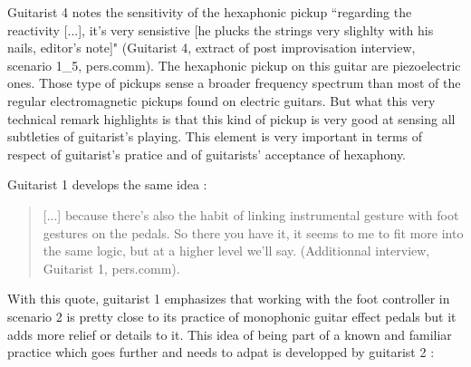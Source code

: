 \documentclass{article}
\begin{document}
Guitarist 4 notes the sensitivity of the hexaphonic pickup ``regarding the reactivity [...], it's very sensistive [he plucks the strings very slighlty with his nails, editor's note]" (Guitarist 4, extract of post improvisation interview,  scenario 1\_5, pers.comm). The hexaphonic pickup on this guitar are piezoelectric ones. Those type of pickups sense a broader frequency spectrum \cite{sci:Lemme_SoundSecret_electricGuitar} than most of the regular electromagnetic pickups found on electric guitars. 
But what this very technical remark highlights is that this kind of pickup is very good at sensing all subtleties of guitarist's playing. This element is very important in terms of respect of guitarist's pratice and of guitarists' acceptance of hexaphony. 


Guitarist 1 develops the same idea :


\begin{quote}
[...] because there's also the habit of linking instrumental gesture with foot gestures on the pedals. So there you have it, it seems to me to fit more into the same logic, but at a higher level we'll say. (Additionnal interview, Guitarist 1, pers.comm).
\end{quote}

With this quote, guitarist 1 emphasizes that working with the foot controller in scenario 2 is pretty close to its practice of monophonic guitar effect pedals but it adds more relief or details to it. This idea of being part of a known and familiar practice which goes further and needs to adpat is developped by guitarist 2 : 
\end{document}
